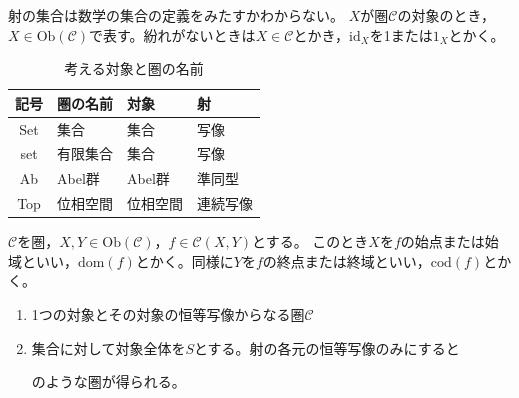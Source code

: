 \documentclass[dvipdfmx]{jsreport}
\newcommand{\category}[1]{\mathcal{#1}}
\newcommand{\object}[1]{\mathrm{Ob}{(\category{#1})}}
\newcommand{\id}[1]{\mathrm{id}_{#1}}
\newcommand{\domain}[1]{\mathrm{dom}(#1)}
\newcommand{\codomain}[1]{\mathrm{cod}(#1)}
\begin{document}
    射の集合は数学の集合の定義をみたすかわからない。
    $X$が圏$\category{C}$の対象のとき，$X\in \object{C}$で表す。紛れがないときは$X\in \category{C}$とかき，$\id{X}$を1または$1_X$とかく。

\begin{table}[h]
\begin{center}
\begin{tabular}{c|lll}
    記号& 圏の名前& 対象& 射\\ \hline
    Set& 集合& 集合& 写像\\
    set& 有限集合& 集合& 写像\\
    Ab& Abel群& Abel群& 準同型\\
    Top& 位相空間& 位相空間& 連続写像\\
\end{tabular}
\end{center}
\caption{考える対象と圏の名前}
\end{table}

    $\category{C}$を圏，$X, Y\in\object{C}$，$f\in \category{C}(X, Y)$とする。
    このとき$X$を$f$の始点または始域といい，$\domain{f}$とかく。同様に$Y$を$f$の終点または終域といい，$\codomain{f}$とかく。

\begin{enumerate}
    \item 1つの対象とその対象の恒等写像からなる圏$\category{C}$
\begin{figure}

\end{figure}    

    \item 集合に対して対象全体を$S$とする。射の各元の恒等写像のみにすると
\begin{figure}

\end{figure}    
    のような圏が得られる。
\end{enumerate}
\end{document}
